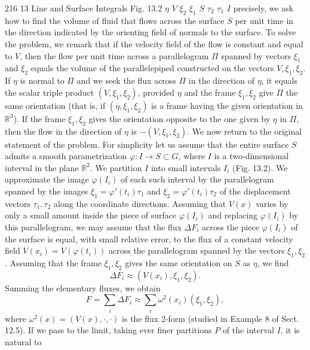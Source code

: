 216
13 Line and Surface Integrals
Fig. 13.2
$\eta$
$V$
$\xi_2$
$\xi_1$
$S$
$\tau_2$ $\tau_1$
$I$
precisely, we ask how to find the volume of fluid that flows across the surface $S$ per
unit time in the direction indicated by the orienting field of normals to the surface.
To solve the problem, we remark that if the velocity field of the flow is constant
and equal to $V$, then the flow per unit time across a parallelogram $\Pi$ spanned by
vectors $\xi_1$ and $\xi_2$ equals the volume of the parallelepiped constructed on the vectors
$V, \xi_1, \xi_2$. If $\eta$ is normal to $\Pi$ and we seek the flux across $\Pi$ in the direction of $\eta$,
it equals the scalar triple product $(V, \xi_1, \xi_2)$, provided $\eta$ and the frame $\xi_1, \xi_2$ give
$\Pi$ the same orientation (that is, if $(\eta, \xi_1, \xi_2)$ is a frame having the given orientation
in $\mathbb{R}^3$). If the frame $\xi_1, \xi_2$ gives the orientation opposite to the one given by $\eta$ in $\Pi$,
then the flow in the direction of $\eta$ is $- (V, \xi_1, \xi_2)$.
We now return to the original statement of the problem. For simplicity let us
assume that the entire surface $S$ admits a smooth parametrization $\varphi : I \to S \subset G$,
where $I$ is a two-dimensional interval in the plane $\mathbb{R}^2$. We partition $I$ into small
intervals $I_i$ (Fig. 13.2). We approximate the image $\varphi(I_i)$ of each such interval by
the parallelogram spanned by the images $\xi_1 = \varphi'(t_i)\tau_1$ and $\xi_2 = \varphi'(t_i)\tau_2$ of the
displacement vectors $\tau_1, \tau_2$ along the coordinate directions. Assuming that $V(x)$
varies by only a small amount inside the piece of surface $\varphi(I_i)$ and replacing $\varphi(I_i)$
by this parallelogram, we may assume that the flux $\Delta F_i$ across the piece $\varphi(I_i)$ of
the surface is equal, with small relative error, to the flux of a constant velocity field
$V(x_i) = V(\varphi(t_i))$ across the parallelogram spanned by the vectors $\xi_1, \xi_2$.
Assuming that the frame $\xi_1, \xi_2$ gives the same orientation on $S$ as $\eta$, we find
$$ \Delta F_i \approx (V(x_i), \xi_1, \xi_2). $$
Summing the elementary fluxes, we obtain
$$ F = \sum_i \Delta F_i \approx \sum_i \omega^2(x_i)(\xi_1, \xi_2), $$
where $\omega^2(x) = (V(x), \cdot, \cdot)$ is the flux 2-form (studied in Example 8 of Sect. 12.5).
If we pass to the limit, taking ever finer partitions $P$ of the interval $I$, it is natural to